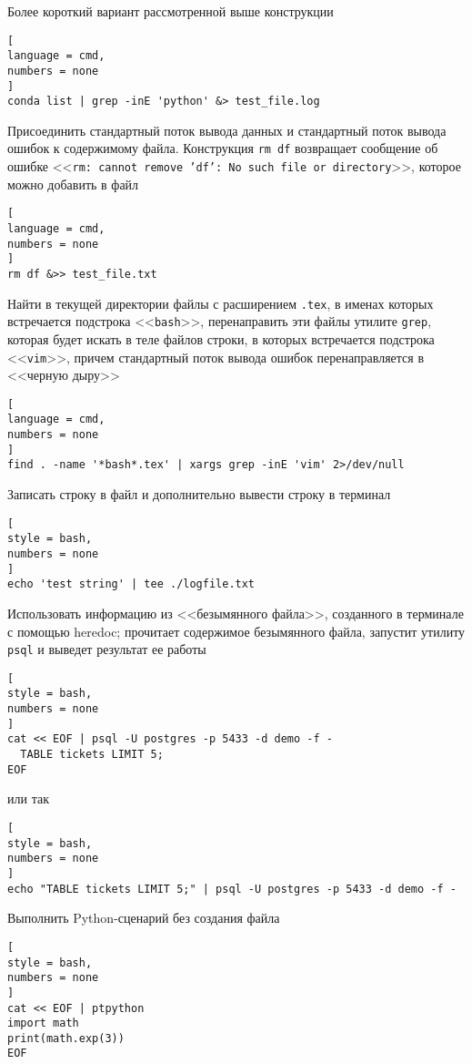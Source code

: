 \documentclass[%
	11pt,
	a4paper,
	utf8,
		]{article}
\begin{document}
Более короткий вариант рассмотренной выше конструкции
\begin{lstlisting}[
language = cmd,
numbers = none
]
conda list | grep -inE 'python' &> test_file.log
\end{lstlisting}

Присоединить стандартный поток вывода данных и стандартный поток вывода ошибок к содержимому файла. Конструкция \texttt{rm df} возвращает сообщение об ошибке <<\texttt{rm: cannot remove 'df': No such file or directory}>>, которое можно добавить в файл
\begin{lstlisting}[
language = cmd,
numbers = none
]
rm df &>> test_file.txt
\end{lstlisting}

Найти в текущей директории файлы с расширением \texttt{.tex}, в именах которых встречается подстрока <<\texttt{bash}>>, перенаправить эти файлы утилите \texttt{grep}, которая будет искать в теле файлов строки, в которых встречается подстрока <<\texttt{vim}>>, причем стандартный поток вывода ошибок перенаправляется в <<черную дыру>>
\begin{lstlisting}[
language = cmd,
numbers = none
]
find . -name '*bash*.tex' | xargs grep -inE 'vim' 2>/dev/null
\end{lstlisting}

Записать строку в файл и дополнительно вывести строку в терминал
\begin{lstlisting}[
style = bash,
numbers = none
]
echo 'test string' | tee ./logfile.txt
\end{lstlisting}

Использовать информацию из <<безымянного файла>>, созданного в терминале с помощью heredoc; прочитает содержимое безымянного файла, запустит утилиту \texttt{psql} и выведет результат ее работы
\begin{lstlisting}[
style = bash,
numbers = none	
]
cat << EOF | psql -U postgres -p 5433 -d demo -f -
  TABLE tickets LIMIT 5;
EOF
\end{lstlisting}
или так
\begin{lstlisting}[
style = bash,
numbers = none
]
echo "TABLE tickets LIMIT 5;" | psql -U postgres -p 5433 -d demo -f -
\end{lstlisting}

Выполнить Python-сценарий без создания файла
\begin{lstlisting}[
style = bash,
numbers = none
]
cat << EOF | ptpython
import math
print(math.exp(3))
EOF
\end{lstlisting}
\end{document}
